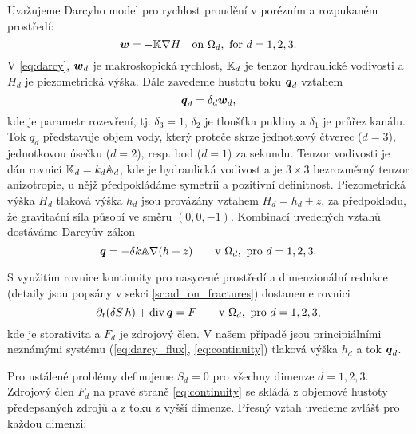 

Uvažujeme Darcyho model pro rychlost proudění v porézním a rozpukaném prostředí:
\begin{equation}
    \label{eq:darcy}
    \mathbf{\boldsymbol{w}} = -{\mathbb{K}} \nabla H \quad\text{on }\Omega_d,\ \text{for $d=1,2,3$}.
\end{equation}
V \eqref{eq:darcy}, $\mathbf{\boldsymbol{w}}_d$  je makroskopická rychlost,
${\mathbb{K}}_d$ je tenzor hydraulické vodivosti a $H_d$  je piezometrická výška. Dále zavedeme hustotu toku $\mathbf{\boldsymbol{q}}_d$ 
  vztahem
\[
    \mathbf{\boldsymbol{q}}_d = \delta_d \mathbf{\boldsymbol{w}}_d,
\]
kde
 je parametr rozevření, tj. $\delta_3=1$, $\delta_2$  je tloušťka pukliny a $\delta_1$  je průřez kanálu.
Tok $q_d$ představuje objem vody, který proteče skrze jednotkový čtverec ($d=3$),
jednotkovou úsečku ($d=2$), resp. bod ($d=1$) za sekundu. 
Tenzor vodivosti je dán rovnicí 
${\mathbb{K}}_d = k_d {\mathbb{A}}_d$, kde
 je hydraulická vodivost  a
 je
$3\times 3$ bezrozměrný tenzor anizotropie, u nějž předpokládáme symetrii a pozitivní definitnost. Piezometrická výška $H_d$ tlaková výška
$h_d$ jsou provázány vztahem $H_d = h_d + z$, za předpokladu, že gravitační síla působí ve směru $(0,0,-1)$. 
Kombinací uvedených vztahů dostáváme Darcyův zákon
\begin{equation}
    \label{eq:darcy_flux}
    \vc q = -\delta k\tn A \grad (h+z)  \qquad\text{v }\Omega_d,\ \text{pro $d=1,2,3$}.
\end{equation}

S využitím rovnice kontinuity pro nasycené prostředí a dimenzionální redukce (detaily jsou popsány v sekci \ref{sc:ad_on_fractures}) dostaneme rovnici
\begin{equation}
    \label{eq:continuity}
    \prtl_t (\delta S\, h) + \div \vc q = F \qquad \text{v }\Omega_d,\ \text{pro $d=1,2,3$},
\end{equation}
kde   je storativita a $F_d$  je zdrojový člen. V našem případě jsou principiálními neznámými systému
(\ref{eq:darcy_flux}, \ref{eq:continuity}) tlaková výška $h_d$ a tok $\mathbf{\boldsymbol{q}}_d$.


Pro ustálené problémy definujeme $S_d=0$ pro všechny dimenze $d=1,2,3$.
Zdrojový člen $F_d$ na pravé straně \eqref{eq:continuity} se skládá z objemové hustoty předepsaných zdrojů
  a z toku z vyšší dimenze. 
Přesný vztah uvedeme zvlášť pro každou dimenzi:

